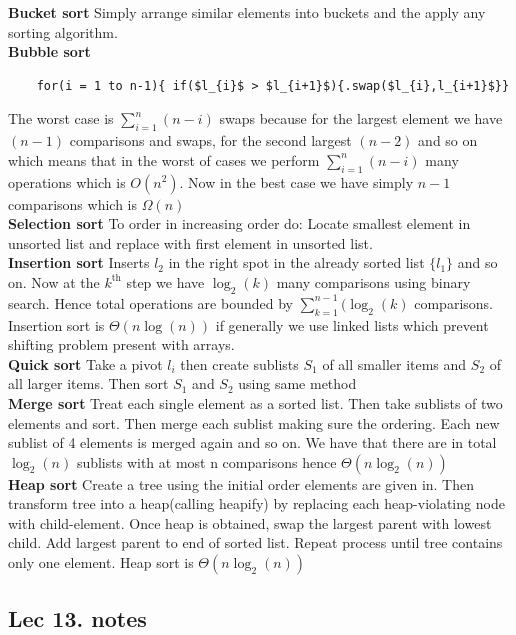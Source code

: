 \documentclass[titlepage]{article}
\theoremstyle{definition}
\numberwithin{equation}{subsection}
\numberwithin{remark}{subsection}
\begin{document}
\begin{tcolorbox}[drop shadow, title=(Overview of algorithms),lower separated=true]
\textbf{Bucket sort}
Simply arrange similar elements into buckets and the apply any sorting algorithm.
\\
\textbf{Bubble sort}
\begin{lstlisting}
    for(i = 1 to n-1){ if($l_{i}$ > $l_{i+1}$){.swap($l_{i},l_{i+1}$}}
\end{lstlisting}
The worst case is $\sum_{i=1}^{n} (n-i)$ swaps because for the largest element we have $(n-1)$ comparisons and swaps, for the second largest $(n-2)$ and so on which means that in the worst of cases we perform  $\sum_{i=1}^{n} (n-i)$ many operations which is $O(n^2)$. Now in the best case we have simply $n-1$ comparisons which is $\Omega(n)$
\\
\textbf{Selection sort}
To order in increasing order do: Locate smallest element in unsorted list and replace with first element in unsorted list. 
\\
\textbf{Insertion sort} Inserts $l_{2}$ in the right spot in the already sorted list $\{l_{1}\}$ and so on. Now at the $k^{\text{th}}$ step we have $\log_{2}(k)$ many comparisons using binary search. Hence total operations are bounded by $\sum_{k=1}^{n-1}(\log_{2}(k)$ comparisons. Insertion sort is $\Theta(n\log(n))$ if generally we use linked lists which prevent shifting problem present with arrays. 
\\
\textbf{Quick sort}
Take a pivot $l_{i}$ then create sublists $S_{1}$ of all smaller items and $S_{2}$ of all larger items. Then sort $S_{1}$ and $S_{2}$ using same method
\\
\textbf{Merge sort}
Treat each single element as a sorted list. Then take sublists of two elements and sort. Then merge each sublist making sure the ordering. Each new sublist of 4 elements is merged again and so on. We have that there are in total $\log_{2}(n)$ sublists with at most n comparisons hence $\Theta(n\log_{2}(n))$
\\
\textbf{Heap sort}
Create a tree using the initial order elements are given in. Then transform tree into a heap(calling heapify) by replacing each heap-violating node with child-element. Once heap is obtained, swap the largest parent with lowest child. Add largest parent to end of sorted list. Repeat process until tree contains only one element. Heap sort is $\Theta(n\log_{2}(n))$
\end{tcolorbox}


\subsection{Lec 13. notes}
\end{document}
